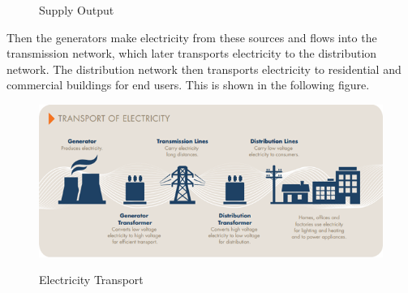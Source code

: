 \documentclass[12pt]{article}
\begin{document}
\begin{flushleft}
\begin{figure}[!h]
\begin{minipage}[b]{0.45\textwidth}
    \caption{Supply Output}
  \end{minipage}
\end{figure}
Then the generators make electricity from these sources and flows into the transmission network, which later transports electricity to the distribution network. The distribution network then transports electricity to residential and commercial buildings for end users.\parencite{aemc1} This is shown in the following figure. 
\begin{figure}[!h]
  \centering
  \includegraphics[width=\textwidth]{transport.png}
    \caption{Electricity Transport}
    \parencite{aemo1pic}
\end{figure}
\end{flushleft}
\newpage
\end{document}
